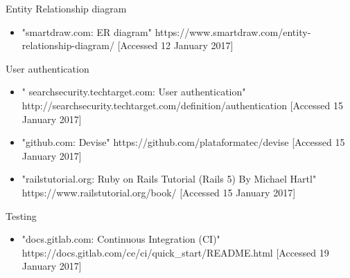 \documentclass{l3proj}
\begin{document}
\label{er}
Entity Relationship diagram

\begin{itemize}

\item "smartdraw.com: ER diagram"
\newline https://www.smartdraw.com/entity-relationship-diagram/ [Accessed 12 January 2017]

\end{itemize}

\label{authentication}
User authentication

\begin{itemize}

\item " searchsecurity.techtarget.com: User authentication"
\newline http://searchsecurity.techtarget.com/definition/authentication [Accessed 15 January 2017]

\item "github.com: Devise"
\newline https://github.com/plataformatec/devise [Accessed 15 January 2017]

\item "railstutorial.org: Ruby on Rails Tutorial (Rails 5) By Michael Hartl"
\newline https://www.railstutorial.org/book/ [Accessed 15 January 2017]

\end{itemize}

\label{testing}

Testing

\begin{itemize}

\item "docs.gitlab.com: Continuous Integration (CI)"
\newline https://docs.gitlab.com/ce/ci/quick\_start/README.html [Accessed 19 January 2017]

\end{itemize}
\fi
\end{document}
